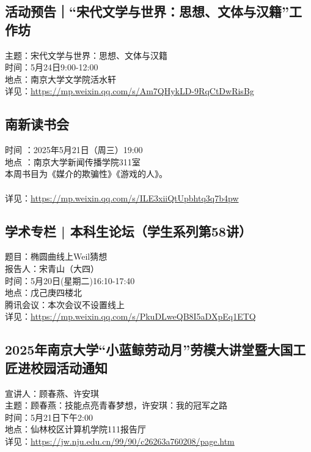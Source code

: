\documentclass[letterpaper, 12pt]{article}
\begin{document}
\begin{multicols}{2}
\subsection{活动预告｜“宋代文学与世界：思想、文体与汉籍”工作坊} %
主题：宋代文学与世界：思想、文体与汉籍
\\时间：5月24日9:00-12:00
\\地点：南京大学文学院活水轩
\\详见：\url{https://mp.weixin.qq.com/s/Am7QHykLD-9RqCtDwRisBg}
\subsection{南新读书会} %
时间 ：2025年5月21日（周三）19:00 
\\地点 ：南京大学新闻传播学院311室
\\本周书目为《媒介的欺骗性》《游戏的人》。
\\
\\详见：\url{https://mp.weixin.qq.com/s/ILE3xiiQtUpbhtq3q7b4pw}
\subsection{学术专栏 | 本科生论坛（学生系列第58讲）} %
题目：椭圆曲线上Weil猜想
\\报告人：宋青山（大四）
\\时间：5月20日(星期二)16:10-17:40
\\地点：戊己庚四楼北
\\腾讯会议：本次会议不设置线上
\\详见：\url{https://mp.weixin.qq.com/s/PkuDLweQB8I5aDXpEq1ETQ}

\subsection{2025年南京大学“小蓝鲸劳动月”劳模大讲堂暨大国工匠进校园活动通知} %
宣讲人：顾春燕、许安琪
\\主题：顾春燕：技能点亮青春梦想，许安琪：我的冠军之路
\\时间：5月21日下午2:00
\\地点：仙林校区计算机学院111报告厅
\\详见：\url{https://jw.nju.edu.cn/99/90/c26263a760208/page.htm}

\end{multicols}
\end{document}
